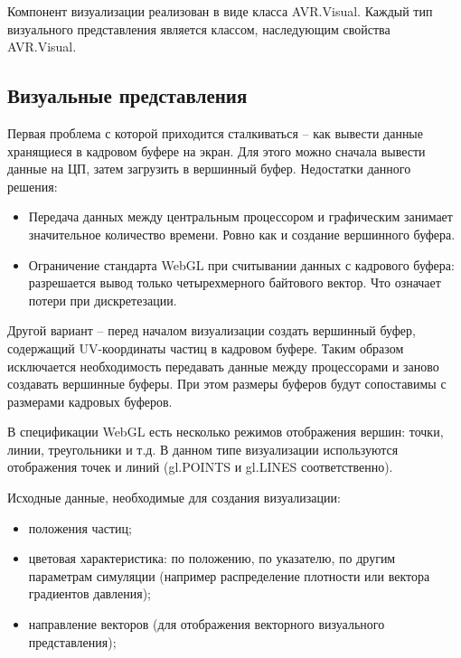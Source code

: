 Компонент визуализации реализован в виде класса AVR.Visual. Каждый тип визуального представления
является классом, наследующим свойства AVR.Visual.

\subsection{Визуальные представления}


Первая проблема с которой приходится сталкиваться -- как вывести данные хранящиеся в кадровом
буфере на экран. Для этого можно сначала вывести данные на ЦП, затем загрузить в вершинный буфер.
Недостатки данного решения:

\begin{itemize}
  \item Передача данных между центральным процессором и графическим занимает значительное
    количество времени. Ровно как и создание вершинного буфера.
  \item Ограничение стандарта WebGL при считывании данных с кадрового буфера: разрешается
    вывод только четырехмерного байтового вектор. Что означает потери при дискретезации.
\end{itemize}

Другой вариант -- перед началом визуализации создать вершинный буфер, содержащий UV-координаты
частиц в кадровом буфере. Таким образом исключается необходимость передавать данные
между процессорами и заново создавать вершинные буферы. При этом размеры буферов будут
сопоставимы с размерами кадровых буферов.

В спецификации WebGL есть несколько режимов отображения вершин: точки, линии, треугольники и т.д.
В данном типе визуализации используются отображения точек и линий (gl.POINTS и gl.LINES соответственно).

Исходные данные, необходимые для создания визуализации:

\begin{itemize}
  \item положения частиц;
  \item цветовая характеристика: по положению, по указателю, по другим параметрам симуляции 
    (например распределение плотности или вектора градиентов давления);
  \item направление векторов (для отображения векторного визуального представления);
\end{itemize}

